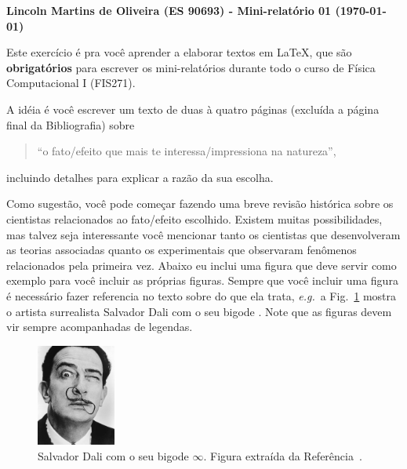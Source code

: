 \documentclass[a4wide]{report}
\begin{document}
\noindent
{\bf Lincoln Martins de Oliveira (ES 90693) - Mini-relatório 01 (\today)}

\vspace{0.5cm}


	Este exercício é pra você aprender a elaborar textos em \LaTeX, 
que são {\bf obrigatórios} para escrever os mini-relatórios durante todo o 
curso de Física Computacional I (FIS271).

	A idéia é você escrever um texto de duas à quatro páginas (excluída 
a página final da Bibliografia) sobre
\begin{quote}
\centering
``o fato/efeito que mais te interessa/impressiona na natureza'',
\end{quote}
incluindo detalhes para explicar a razão da sua escolha.

	Como sugestão, você pode começar fazendo uma breve revisão histórica 
sobre os cientistas relacionados ao fato/efeito escolhido.
	Existem muitas possibilidades, mas talvez seja interessante você
mencionar tanto os cientistas que desenvolveram as teorias associadas quanto os
experimentais que observaram fenômenos relacionados pela primeira vez.
	Abaixo eu inclui uma figura que deve servir como exemplo para você
incluir as próprias figuras.
	Sempre que você incluir uma figura é necessário fazer referencia 
no texto sobre do que ela trata, {\it e.g.}~a Fig.~\ref{dali_self_portrait} mostra o artista
surrealista Salvador Dali com o seu bigode .
	Note que as figuras devem vir sempre acompanhadas de legendas.



\begin{figure}[h]
\centering
\includegraphics[width=0.23\textwidth]{fig1_salvador_dali_infinity}
\caption{Salvador Dali com o seu bigode $\infty$.
Figura extraída da Referência~\cite{dalipic}.}
\label{dali_self_portrait}
\end{figure}
\end{document}

